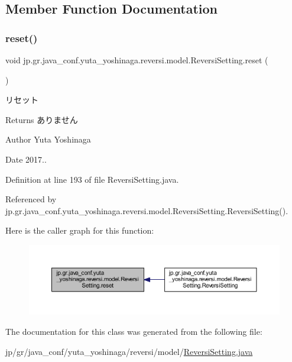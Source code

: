 \subsection{Member Function Documentation}
\mbox{\label{classjp_1_1gr_1_1java__conf_1_1yuta__yoshinaga_1_1reversi_1_1model_1_1_reversi_setting_afef8530666d1ce3522fd53938cd00353}} 
\subsubsection{\texorpdfstring{reset()}{reset()}}
{\footnotesize\ttfamily void jp.\+gr.\+java\+\_\+conf.\+yuta\+\_\+yoshinaga.\+reversi.\+model.\+Reversi\+Setting.\+reset (\begin{DoxyParamCaption}{ }\end{DoxyParamCaption})}



リセット 

\begin{DoxyReturn}{Returns}
ありません 
\end{DoxyReturn}
\begin{DoxyAuthor}{Author}
Yuta Yoshinaga 
\end{DoxyAuthor}
\begin{DoxyDate}{Date}
2017.. 
\end{DoxyDate}


Definition at line 193 of file Reversi\+Setting.\+java.



Referenced by jp.\+gr.\+java\+\_\+conf.\+yuta\+\_\+yoshinaga.\+reversi.\+model.\+Reversi\+Setting.\+Reversi\+Setting().

Here is the caller graph for this function\+:\nopagebreak
\begin{figure}[H]
\begin{center}
\leavevmode
\includegraphics[width=350pt]{classjp_1_1gr_1_1java__conf_1_1yuta__yoshinaga_1_1reversi_1_1model_1_1_reversi_setting_afef8530666d1ce3522fd53938cd00353_icgraph}
\end{center}
\end{figure}


The documentation for this class was generated from the following file\+:\begin{DoxyCompactItemize}
\item 
jp/gr/java\+\_\+conf/yuta\+\_\+yoshinaga/reversi/model/\hyperlink{_reversi_setting_8java}{Reversi\+Setting.\+java}\end{DoxyCompactItemize}
